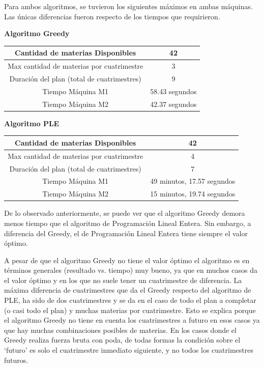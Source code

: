 \documentclass[a4paper]{article}
\begin{document}
Para ambos algoritmos, se tuvieron los siguientes máximos en ambas máquinas. Las únicas diferencias fueron respecto de los tiempos que requirieron.\newline

\textbf{Algoritmo Greedy}

\begin{table}[htbp]
\begin{center}
\begin{tabular}{|c|c|}
\hline
Cantidad de materias Disponibles		 		& 	42\\
\hline
Max cantidad de materias por cuatrimestre 		& 	3\\
\hline
Duración del plan (total de cuatrimestres)		& 	9\\
\hline
Tiempo Máquina M1								& 	58.43 segundos\\
\hline
Tiempo Máquina M2 								& 	42.37 segundos\\
\hline
\end{tabular}
\end{center}
\end{table}

\textbf{Algoritmo PLE}

\begin{table}[htbp]
\begin{center}
\begin{tabular}{|c|c|}
\hline
Cantidad de materias Disponibles 				& 	42\\
\hline
Max cantidad de materias por cuatrimestre		& 	4\\
\hline
Duración del plan (total de cuatrimestres)		& 	7\\
\hline
Tiempo Máquina M1								& 	49 minutos, 17.57 segundos\\
\hline
Tiempo Máquina M2								& 	15 minutos, 19.74 segundos\\
\hline
\end{tabular}
\end{center}
\end{table}

De lo observado anteriormente, se puede ver que el algoritmo Greedy demora menos tiempo que el algoritmo de Programación Lineal Entera. Sin embargo, a diferencia del Greedy, el de Programación Lineal Entera tiene siempre el valor óptimo.

A pesar de que el algoritmo Greedy no tiene el valor óptimo el algoritmo es en términos generales (resultado vs. tiempo) muy bueno, ya que en muchos casos da el valor óptimo y en los que no suele tener un cuatrimestre de diferencia. La máxima diferencia de cuatrimestres que da el Greedy respecto del algoritmo de PLE, ha sido de dos cuatrimestres y se da en el caso de todo el plan a completar (o casi todo el plan) y muchas materias por cuatrimestre. Esto se explica porque el algoritmo Greedy no tiene en cuenta los cuatrimestres a futuro en esos casos ya que hay muchas combinaciones posibles de materias. En los casos donde el Greedy realiza fuerza bruta con poda, de todas formas la condición sobre el `futuro' es solo el cuatrimestre inmediato siguiente, y no todos los cuatrimestres futuros.
\end{document}
